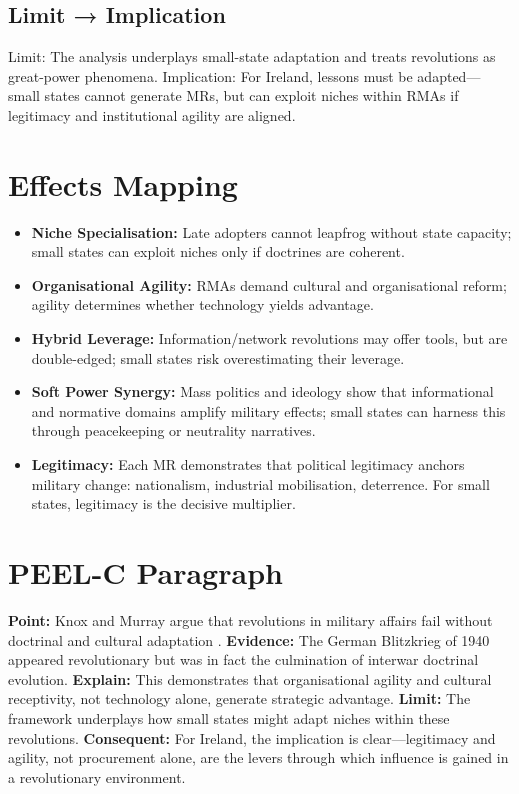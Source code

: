 \subsection*{Limit → Implication}
Limit: The analysis underplays small-state adaptation and treats revolutions as great-power phenomena.  
Implication: For Ireland, lessons must be adapted—small states cannot generate MRs, but can exploit niches within RMAs if legitimacy and institutional agility are aligned.

\section*{Effects Mapping}
\begin{itemize}
	\item \textbf{Niche Specialisation:} Late adopters cannot leapfrog without state capacity; small states can exploit niches only if doctrines are coherent.
	\item \textbf{Organisational Agility:} RMAs demand cultural and organisational reform; agility determines whether technology yields advantage.
	\item \textbf{Hybrid Leverage:} Information/network revolutions may offer tools, but are double-edged; small states risk overestimating their leverage.
	\item \textbf{Soft Power Synergy:} Mass politics and ideology show that informational and normative domains amplify military effects; small states can harness this through peacekeeping or neutrality narratives.
	\item \textbf{Legitimacy:} Each MR demonstrates that political legitimacy anchors military change: nationalism, industrial mobilisation, deterrence. For small states, legitimacy is the decisive multiplier.
\end{itemize}

\section*{PEEL-C Paragraph}
\textbf{Point:} Knox and Murray argue that revolutions in military affairs fail without doctrinal and cultural adaptation \parencite{MURRAY_2001}.  
\textbf{Evidence:} The German Blitzkrieg of 1940 appeared revolutionary but was in fact the culmination of interwar doctrinal evolution.  
\textbf{Explain:} This demonstrates that organisational agility and cultural receptivity, not technology alone, generate strategic advantage.  
\textbf{Limit:} The framework underplays how small states might adapt niches within these revolutions.  
\textbf{Consequent:} For Ireland, the implication is clear—legitimacy and agility, not procurement alone, are the levers through which influence is gained in a revolutionary environment.


